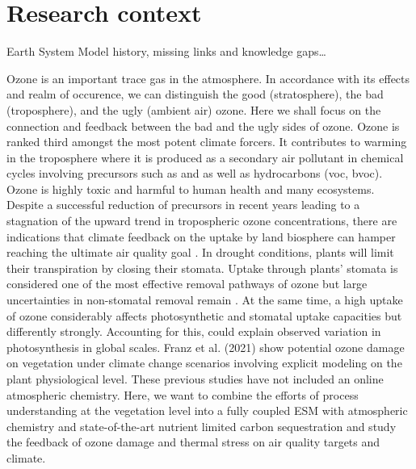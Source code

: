 \documentclass[11pt, letter, oneside, article]{memoir}
\newcommand{\pcite}[1]{\parencite{#1}}
\begin{document}


\chapter{Research context}
Earth System Model history, missing links and knowledge gaps…

Ozone is an important trace gas in the atmosphere. In accordance with its effects and realm of occurence, we can distinguish the good (stratosphere), the bad (troposphere), and the ugly (ambient air) ozone. Here we shall focus on the connection and feedback between the bad and the ugly sides of ozone. Ozone is ranked third amongst the most potent climate forcers. It contributes to warming in the troposphere where it is produced as a secondary air pollutant in chemical cycles involving precursors such as  and  as well as hydrocarbons (\gls{voc}, \gls{bvoc}). Ozone is highly toxic and harmful to human health and many ecosystems. Despite a successful reduction of precursors in recent years leading to a stagnation of the upward trend in tropospheric ozone concentrations, there are indications that climate feedback on the uptake by land biosphere can hamper reaching the ultimate air quality goal \pcite{NCC:Lin2020}. In drought conditions, plants will limit their transpiration by closing their stomata. Uptake through plants’ stomata is considered one of the most effective removal pathways of ozone but large uncertainties in non-stomatal removal remain \pcite{RG:Clifton2020}. At the same time, a high uptake of ozone considerably affects photosynthetic and stomatal uptake capacities but differently strongly. Accounting for this, \cite{BGS:Lombardozzi2013} could explain observed variation in photosynthesis in global scales. Franz et al. (2021) show potential ozone damage on vegetation under climate change scenarios involving explicit modeling on the plant physiological level. These previous studies have not included an online atmospheric chemistry. Here, we want to combine the efforts of process understanding at the vegetation level into a fully coupled ESM with atmospheric chemistry and state-of-the-art nutrient limited carbon sequestration and study the feedback of ozone damage and thermal stress on air quality targets and climate.
\end{document}
